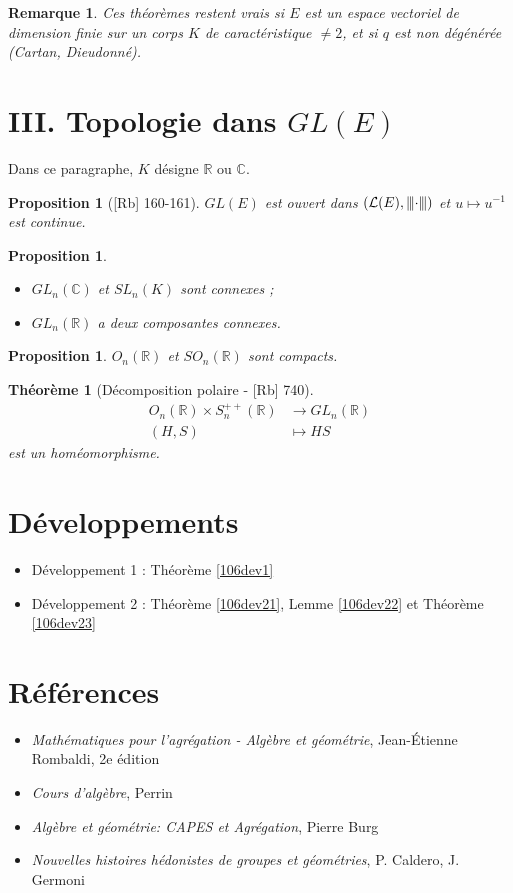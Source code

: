 \documentclass[10pt, a4paper, parskip=full, twoside, twocolumn]{report}
\newtheorem{theorem}[definition]{Théorème}
\newtheorem{proposition}[definition]{Proposition}
\newtheorem{remark}[definition]{Remarque}
\newcommand{\IC}{\mathbb{C}}
\newcommand{\IR}{\mathbb{R}}
\newcommand{\vertiii}[1]{{\left\vert\kern-0.25ex\left\vert\kern-0.25ex\left\vert #1 
    \right\vert\kern-0.25ex\right\vert\kern-0.25ex\right\vert}}
\begin{document}
\begin{remark}
	Ces théorèmes restent vrais si $E$ est un espace vectoriel de dimension finie sur un corps $K$ de caractéristique $\neq 2$, et si $q$ est non dégénérée (Cartan, Dieudonné).
\end{remark}

\section*{III. Topologie dans $GL(E)$}
Dans ce paragraphe, $K$ désigne $\IR$ ou $\IC$.

\begin{proposition}[\textnormal{[Rb] 160-161}]
	$GL(E)$ est ouvert dans $(\mathcal{L}(E), \vertiii\cdot)$ et $u\mapsto u^{-1}$ est continue.
\end{proposition}

\begin{proposition}
	\begin{itemize}
		\item $GL_n(\IC)$ et $SL_n(K)$ sont connexes ;
		\item $GL_n(\IR)$ a deux composantes connexes.
	\end{itemize}
\end{proposition}

\begin{proposition}
	$O_n(\IR)$ et $SO_n(\IR)$ sont compacts.
\end{proposition}

\begin{theorem}[Décomposition polaire - \textnormal{[Rb] 740}]
		\begin{align*}
			O_n(\IR)\times S_n^{++}(\IR) &\to GL_n(\IR) \\
			(H,S) &\mapsto HS
		\end{align*}
		est un homéomorphisme.
\end{theorem}

\section*{Développements}
\begin{itemize}
	\item Développement 1 : Théorème \ref{106dev1}
	\item Développement 2 : Théorème \ref{106dev21}, Lemme \ref{106dev22} et Théorème \ref{106dev23}
\end{itemize}

\section*{Références}
\begin{itemize}
	\item[Rb] \emph{Mathématiques pour l'agrégation - Algèbre et géométrie}, Jean-Étienne Rombaldi, 2e édition
	\item[P] \emph{Cours d'algèbre}, Perrin
	\item[B] \emph{Algèbre et géométrie: CAPES et Agrégation}, Pierre Burg
	\item[C] \emph{Nouvelles histoires hédonistes de groupes et géométries}, P. Caldero, J. Germoni
\end{itemize}
\end{document}
